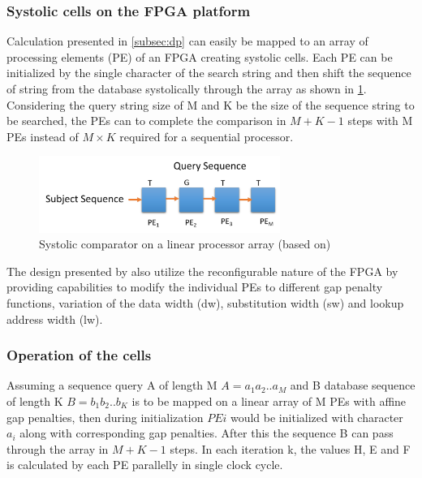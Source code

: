 \documentclass[12pt,twoside]{article}
\begin{document}
\subsubsection{Systolic cells on the FPGA platform}

Calculation presented in \cref{subsec:dp} can easily be mapped to an array of processing elements (PE) of an FPGA creating systolic cells.
Each PE can be initialized by the single character of the search string and then shift the sequence of string from the database systolically
through the array as shown in \cref{fig:systollicarray}. Considering the query string size of M and K be the size of the sequence string to be
searched, the PEs can to complete the comparison in $ M + K-1 $ steps with M PEs instead of $ M \times K $ required for a sequential processor.

\begin{figure}[h]%
    \centering
    \includegraphics[width=0.7\textwidth]{fig/systollic}
    \caption{Systolic comparator on a linear processor array (based on\cite[Figure 2]{oliver_hyper_2005})}
    \label{fig:systollicarray}
\end{figure}

The design presented by \textcite{oliver_hyper_2005} also utilize the reconfigurable nature of the FPGA by providing capabilities to modify the 
individual PEs to different gap penalty functions, variation of the data width (dw), substitution width (sw) and lookup address width (lw). 

\subsubsection{Operation of the cells}

Assuming a sequence query A of length M $ A = a_1a_2 .. a_M $ and B database sequence of length K $B = b_1b_2 .. b_K $ is to be mapped on a linear array of
M PEs with affine gap penalties, then during initialization $ PE i $ would be initialized with character $ a_i $ along with corresponding
gap penalties. After this the sequence B can pass through the array in $M+K-1$ steps. In each iteration k, the values H, E and F is calculated by
each PE parallelly in single clock cycle. 
\end{document}
